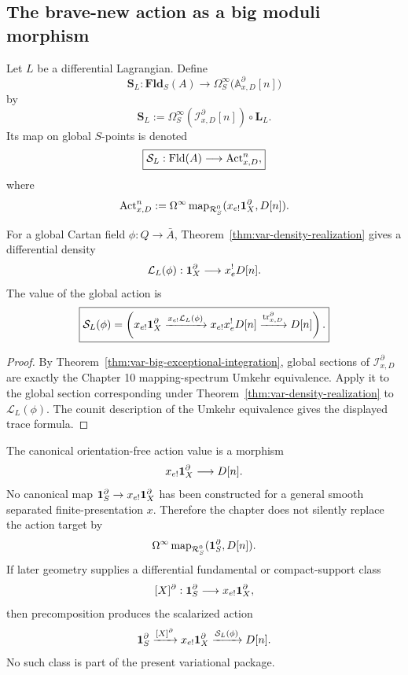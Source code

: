 \subsection{The brave-new action as a big moduli morphism}

\begin{definition}
\label{def:var-action-functional}
Let \(L\) be a differential Lagrangian. Define
\[
    \boxed{
    \mathbf S_L:
    \mathbf{Fld}_S(A)
    \longrightarrow
    \Omega_S^\infty
    \bigl(\mathbb A^\partial_{x,D}[n]\bigr)
    }
\]
by
\[
    \mathbf S_L
    :=
    \Omega_S^\infty(\mathcal I^\partial_{x,D}[n])
    \circ
    \mathbf L_L.
\]
Its map on global \(S\)-points is denoted
\[
    \boxed{
    \mathcal S_L:
    \operatorname{Fld}(A)
    \longrightarrow
    \operatorname{Act}^n_{x,D},
    }
\]
where
\[
    \operatorname{Act}^n_{x,D}
    :=
    \Omega^\infty
    \operatorname{map}_{\mathcal R_S^0}
    (x_{e!}\mathbf 1_X^\partial,D[n]).
\]
\end{definition}

\begin{proposition}
\label{prop:var-global-action-trace}
For a global Cartan field \(\phi:Q\to\bar A\), Theorem~\ref{thm:var-density-realization} gives a differential density
\[
    \mathcal L_L(\phi):
    \mathbf 1_X^\partial\longrightarrow x_e^!D[n].
\]
The value of the global action is
\[
    \boxed{
    \mathcal S_L(\phi)
    =
    \left(
    x_{e!}\mathbf 1_X^\partial
    \xrightarrow{x_{e!}\mathcal L_L(\phi)}
    x_{e!}x_e^!D[n]
    \xrightarrow{\operatorname{tr}^\partial_{x,D}}
    D[n]
    \right).
    }
\]
\end{proposition}

\begin{proof}
By Theorem~\ref{thm:var-big-exceptional-integration}, global sections of \(\mathcal I^\partial_{x,D}\) are exactly the Chapter 10 mapping-spectrum Umkehr equivalence.  Apply it to the global section corresponding under Theorem~\ref{thm:var-density-realization} to \(\mathcal L_L(\phi)\).  The counit description of the Umkehr equivalence gives the displayed trace formula.
\end{proof}

\begin{remark}
\label{rem:var-action-not-scalar}
The canonical orientation-free action value is a morphism
\[
    x_{e!}\mathbf 1_X^\partial\longrightarrow D[n].
\]
No canonical map \(\mathbf 1_S^\partial\to x_{e!}\mathbf 1_X^\partial\) has been constructed for a general smooth separated finite-presentation \(x\). Therefore the chapter does not silently replace the action target by
\[
    \Omega^\infty\operatorname{map}_{\mathcal R_S^0}(\mathbf 1_S^\partial,D[n]).
\]
If later geometry supplies a differential fundamental or compact-support class
\[
    [X]^\partial:\mathbf 1_S^\partial\longrightarrow x_{e!}\mathbf 1_X^\partial,
\]
then precomposition produces the scalarized action
\[
    \mathbf 1_S^\partial\xrightarrow{[X]^\partial}x_{e!}\mathbf 1_X^\partial
    \xrightarrow{\mathcal S_L(\phi)}D[n].
\]
No such class is part of the present variational package.
\end{remark}

